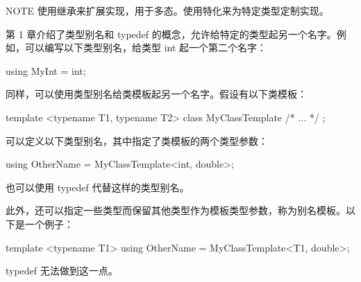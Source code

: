 \begin{myNotic}{NOTE}
使用继承来扩展实现，用于多态。使用特化来为特定类型定制实现。
\end{myNotic}


第 1 章介绍了类型别名和 typedef 的概念，允许给特定的类型起另一个名字。例如，可以编写以下类型别名，给类型 int 起一个第二个名字：

\begin{cpp}
using MyInt = int;
\end{cpp}

同样，可以使用类型别名给类模板起另一个名字。假设有以下类模板：

\begin{cpp}
template <typename T1, typename T2>
class MyClassTemplate { /* ... */ };
\end{cpp}

可以定义以下类型别名，其中指定了类模板的两个类型参数：

\begin{cpp}
using OtherName = MyClassTemplate<int, double>;
\end{cpp}

也可以使用 typedef 代替这样的类型别名。

此外，还可以指定一些类型而保留其他类型作为模板类型参数，称为别名模板。以下是一个例子：

\begin{cpp}
template <typename T1>
using OtherName = MyClassTemplate<T1, double>;
\end{cpp}

typedef 无法做到这一点。









